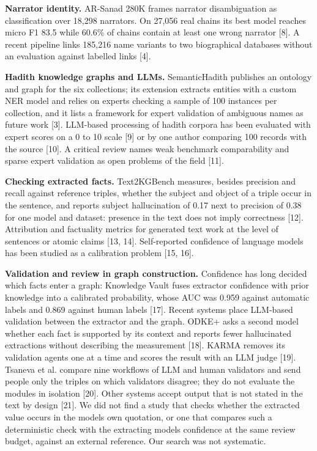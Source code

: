 \documentclass[
  english,
]{article}
\begin{document}
\textbf{Narrator identity.} AR-Sanad 280K frames narrator disambiguation
as classification over 18,298 narrators. On 27,056 real chains its best
model reaches micro F1 83.5 while 60.6\% of chains contain at least one
wrong narrator {[}8{]}. A recent pipeline links 185,216 name variants to
two biographical databases without an evaluation against labelled links
{[}4{]}.

\textbf{Hadith knowledge graphs and LLMs.} SemanticHadith publishes an
ontology and graph for the six collections; its extension extracts
entities with a custom NER model and relies on experts checking a sample
of 100 instances per collection, and it lists a framework for expert
validation of ambiguous names as future work {[}3{]}. LLM-based
processing of hadith corpora has been evaluated with expert scores on a
0 to 10 scale {[}9{]} or by one author comparing 100 records with the
source {[}10{]}. A critical review names weak benchmark comparability
and sparse expert validation as open problems of the field {[}11{]}.

\textbf{Checking extracted facts.} Text2KGBench measures, besides
precision and recall against reference triples, whether the subject and
object of a triple occur in the sentence, and reports subject
hallucination of 0.17 next to precision of 0.38 for one model and
dataset: presence in the text does not imply correctness {[}12{]}.
Attribution and factuality metrics for generated text work at the level
of sentences or atomic claims {[}13, 14{]}. Self-reported confidence of
language models has been studied as a calibration problem {[}15, 16{]}.

\textbf{Validation and review in graph construction.} Confidence has
long decided which facts enter a graph: Knowledge Vault fuses extractor
confidence with prior knowledge into a calibrated probability, whose AUC
was 0.959 against automatic labels and 0.869 against human labels
{[}17{]}. Recent systems place LLM-based validation between the
extractor and the graph. ODKE+ asks a second model whether each fact is
supported by its context and reports fewer hallucinated extractions
without describing the measurement {[}18{]}. KARMA removes its
validation agents one at a time and scores the result with an LLM judge
{[}19{]}. Tsaneva et al. compare nine workflows of LLM and human
validators and send people only the triples on which validators
disagree; they do not evaluate the modules in isolation {[}20{]}. Other
systems accept output that is not stated in the text by design {[}21{]}.
We did not find a study that checks whether the extracted value occurs
in the model\textquotesingle s own quotation, or one that compares such
a deterministic check with the extracting model\textquotesingle s
confidence at the same review budget, against an external reference. Our
search was not systematic.
\end{document}
